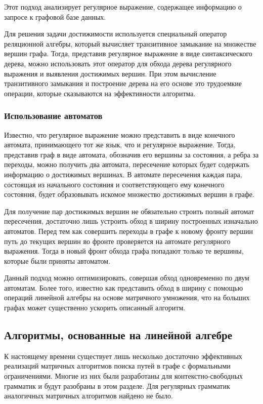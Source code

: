 Этот подход анализирует регулярное выражение, содержащее информацию о запросе к графовой базе данных.

Для решения задачи достижимости используется специальный оператор реляционной алгебры, который вычисляет транзитивное замыкание на множестве вершин графа. Тогда, представив регулярное выражение в виде синтаксического дерева, можно использовать этот оператор для обхода дерева регулярного выражения и выявления достижимых вершин. При этом вычисление транзитивного замыкания и  построение дерева на его основе это трудоемкие операции, которые сказываются на эффективности алгоритма. 

\subsubsection{Использование автоматов}

Известно, что регулярное выражение можно представить в виде конечного автомата, принимающего тот же язык, что и регулярное выражение. Тогда, представив граф в виде автомата, обозначив его вершины за состояния, а ребра за переходы, можно получить два автомата, пересечение которых будет содержать информацию о достижимых вершинах. В автомате пересечения каждая пара, состоящая из начального состояния и соответствующего ему конечного состояния, будет образовывать искомое множество достижимых вершин в графе.

Для получение пар достижимых вершин не обязательно строить полный автомат пересечения, достаточно лишь устроить обход в ширину построенных изначально автоматов. Перед тем как совершить переходы в графе к новому фронту вершин путь до текущих вершин во фронте проверяется на автомате регулярного выражения. Тогда в новый фронт обхода графа попадают только те вершины, которые были приняты автоматом.

Данный подход можно оптимизировать, совершая обход одновременно по двум автоматам. Более того, известно как представить обход в ширину с помощью операций линейной алгебры на основе матричного умножения, что на больших графах может существенно ускорить описанный алгоритм.

\subsection{Алгоритмы, основанные на линейной алгебре}

К настоящему времени существует лишь несколько достаточно эффективных реализаций матричных алгоритмов поиска путей в графе с формальными ограничениями. Многие из них были разработаны для контекстно-свободных грамматик и будут разобраны в этом разделе. Для регулярных грамматик аналогичных матричных алгоритмов найдено не было.

